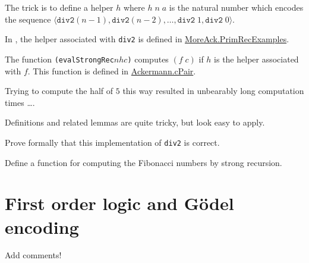   The trick is to define a helper $h$ where
  $h\;n\;a$ is the natural number which encodes
  the sequence $\langle \texttt{div2}(n-1),
  \texttt{div2}(n-2),\dots,\texttt{div2}\;1, \texttt{div2}\;0\rangle$.

  In \coq, the helper associated with \texttt{div2} is defined in
  \href{../theories/html/hydras.MoreAck/PrimRecExamples}{MoreAck.PrimRecExamples}.
  

  
  
  The function \texttt{(evalStrongRec\;$n$\;$h$\;$c$)} computes
  $(f\;c)$ if $h$ is the helper associated with $f$.
  This function is defined in
  \href{../theories/html/hydras.Ackermann.cPair.html}{Ackermann.cPair}.


  Trying to compute the half of $5$ this way resulted in unbearably long computation times \dots.
  

  
  
   Definitions and related lemmas are quite tricky, but look easy to apply. 


  
    \begin{exercise}
      Prove formally that this implementation of \texttt{div2} is correct.
    \end{exercise}


    \begin{exercise}
     Define a function for computing the Fibonacci numbers by strong recursion.
    \end{exercise}

       

\section{First order logic and G\"{o}del encoding}
\begin{todo}
  Add comments!
\end{todo}


